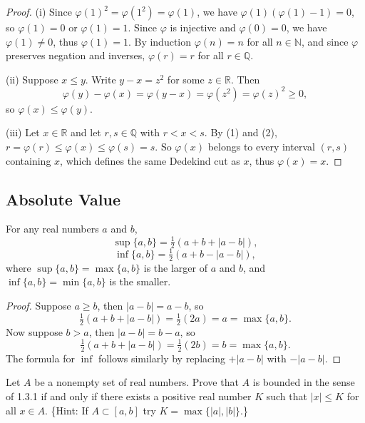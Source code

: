 \begin{proof}
    (i) Since $\varphi(1)^2 = \varphi(1^2) = \varphi(1)$, we have
    $\varphi(1)(\varphi(1) - 1) = 0$, so $\varphi(1) = 0$ or $\varphi(1) = 1$.
    Since $\varphi$ is injective and $\varphi(0) = 0$, we have $\varphi(1) \neq 0$,
    thus $\varphi(1) = 1$. By induction $\varphi(n) = n$ for all $n \in \mathbb{N}$,
    and since $\varphi$ preserves negation and inverses, $\varphi(r) = r$
    for all $r \in \mathbb{Q}$.

    (ii) Suppose $x \leq y$. Write $y - x = z^2$ for some $z \in \mathbb{R}$.
    Then
    \[\varphi(y) - \varphi(x) = \varphi(y - x) = \varphi(z^2) = \varphi(z)^2 \geq 0,\]
    so $\varphi(x) \leq \varphi(y)$.

    (iii)  Let $x \in \mathbb{R}$ and let $r, s \in \mathbb{Q}$ with $r < x < s$.
    By (1) and (2), $r = \varphi(r) \leq \varphi(x) \leq \varphi(s) = s$.
    So $\varphi(x)$ belongs to every interval $(r, s)$ containing $x$,
    which defines the same Dedekind cut as $x$, thus $\varphi(x) = x$.
\end{proof}

\subsection{Absolute Value}

\newpage
\begin{tcolorbox}[title=Problem 1, breakable]
For any real numbers $a$ and $b$,
\[
    \sup\{a,b\} = \tfrac{1}{2}(a + b + |a - b|),
\]
\[
    \inf\{a,b\} = \tfrac{1}{2}(a + b - |a - b|),
\]
where $\sup\{a,b\} = \max\{a,b\}$ is the larger of $a$ and $b$, and $\inf\{a,b\} = \min\{a,b\}$ is the smaller.
\end{tcolorbox}

\begin{proof}
    Suppose $a \ge b$, then $|a - b| = a - b$, so
    \[\tfrac{1}{2}(a + b + |a - b|) = \tfrac{1}{2}(2a) = a = \max\{a,b\}.\]
    Now suppose $b > a$, then $|a - b| = b - a$, so
    \[\tfrac{1}{2}(a + b + |a - b|) = \tfrac{1}{2}(2b) = b = \max\{a,b\}.\]
    The formula for $\inf$ follows similarly by replacing $+|a-b|$ with $-|a-b|$.
\end{proof}

\begin{tcolorbox}[title=Problem 2, breakable]
Let $A$ be a nonempty set of real numbers. Prove that $A$ is bounded in the sense of 1.3.1 if and only if there exists a positive real number $K$ such that $|x| \leq K$ for all $x \in A$. \{Hint: If $A \subset [a,b]$ try $K = \max\{|a|,|b|\}$.\}
\end{tcolorbox}

